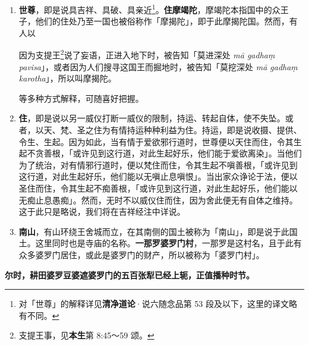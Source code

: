 \begin{enumerate}
\item \textbf{世尊}，即是说具吉祥、具破、具亲近\footnote{对「世尊」的解释详见\textbf{清净道论}·说六随念品第 53 段及以下，这里的译文略有不同。}。\textbf{住摩竭陀}，摩竭陀本指国中的众王子，他们的住处乃至一国也被俗称作「摩揭陀」，即于此摩揭陀国。然而，有人以\begin{quoting}因为支提王\footnote{支提王事，见\textbf{本生}第 8:45～59 颂。}说了妄语，正进入地下时，被告知「莫进深处 \textit{mā gadhaṃ pavisa}」，或者因为人们搜寻这国王而掘地时，被告知「莫挖深处 \textit{mā gadhaṃ karotha}」，所以叫摩揭陀。\end{quoting}等多种方式解释，可随喜好把握。
\item \textbf{住}，即是说以另一威仪打断一威仪的限制，持运、转起自体，使不失坠。或者，以天、梵、圣之住为有情持运种种利益为住。持运，即是说收摄、提供、令生、生起。因为如此，当有情于爱欲邪行道时，世尊便以天住而住，令其生起不贪善根，「或许见到这行道，对此生起好乐，他们能于爱欲离染」。当他们为了统治，对有情邪行道时，便以梵住而住，令其生起不嗔善根，「或许见到这行道，对此生起好乐，他们能以无嗔止息嗔恨」。当出家众诤论于法，便以圣住而住，令其生起不痴善根，「或许见到这行道，对此生起好乐，他们能以无痴止息愚痴」。然而，无时不以威仪住而住，因为舍此便无有自体之维持。这于此只是略说，我们将在吉祥经注中详说。
\item \textbf{南山}，有山环绕王舍城而立，在其南侧的国土被称为「南山」，即是说于此国土。这里同时也是寺庙的名称。\textbf{一那罗婆罗门村}，一那罗是这村名，且于此有众多婆罗门居住，或此是婆罗门的财产，所以被称为「婆罗门村」。\end{enumerate}

\textbf{尔时，耕田婆罗豆婆遮婆罗门的五百张犁已经上轭，正值播种时节。}

